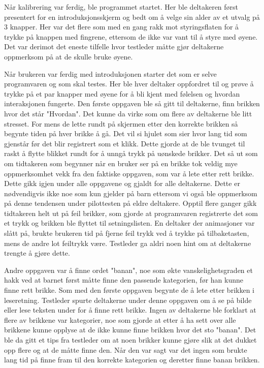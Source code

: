 Når kalibrering var ferdig, ble programmet startet. Her ble deltakeren først presentert for en introduksjonsskjerm og bedt om å velge sin alder av et utvalg på 3 knapper. Her var det flere som med en gang rakk mot styringsflaten for å trykke på knappen med fingrene, ettersom de ikke var vant til å styre med øyene. Det var derimot det eneste tilfelle hvor testleder måtte gjør deltakerne oppmerksom på at de skulle bruke øyene. 
 
Når brukeren var ferdig med introduksjonen starter det som er selve programvaren og som skal testes. Her ble hver deltaker oppfordret til og prøve å trykke på et par knapper med øyene for å bli kjent med følelsen og hvordan interaksjonen fungerte. Den første oppgaven ble så gitt til deltakerne, finn brikken hvor det står "Hvordan". Det kunne da virke som om flere av deltakerne ble litt stresset. For mens de lette rundt på skjermen etter den korrekte brikken så begynte tiden på hver brikke å gå. Det vil si hjulet som sier hvor lang tid som gjenstår før det blir registrert som et klikk. Dette gjorde at de ble tvunget til raskt å flytte blikket rundt for å unngå trykk på uønskede brikker. Det så ut som om tidtakeren som begynner når en bruker ser på en brikke tok veldig mye oppmerksomhet vekk fra den faktiske oppgaven, som var å lete etter rett brikke. Dette gikk igjen under alle oppgavene og gjaldt for alle deltakerne. Dette er nødvendigvis ikke noe som kun gjelder på barn ettersom vi også ble oppmerksom på denne tendensen under pilottesten på eldre deltakere. Opptil flere ganger gikk tidtakeren helt ut på feil brikker, som gjorde at programvaren registrerte det som et trykk og brikken ble flyttet til setningslisten. En deltaker  der animasjoner var slått på, brukte brukeren tid på fjerne feil trykk ved å trykke på tilbaketasten, mens de andre lot feiltrykk være. Testleder ga aldri noen hint om at deltakerne trengte å gjøre dette.  
 
 
Andre oppgaven var å finne ordet "banan", noe som økte vanskelighetsgraden et hakk ved at barnet først måtte finne den passende kategorien, før han kunne finne rett brikke. Som med den første oppgaven begynte de å lete etter brikken i leseretning. Testleder spurte deltakerne under denne oppgaven om å se på bilde eller lese teksten under for å finne rett brikke. Ingen av deltakerne ble forklart at flere av brikkene var kategorier, noe som gjorde at etter å ha sett over alle brikkene kunne opplyse at de ikke kunne finne brikken hvor det sto "banan". Det ble da gitt et tips fra testleder om at noen brikker kunne gjøre slik at det dukket opp flere og at de måtte finne den. Når den var sagt var det ingen som brukte lang tid på finne fram til den korrekte kategorien og deretter finne banan brikken.  
 
